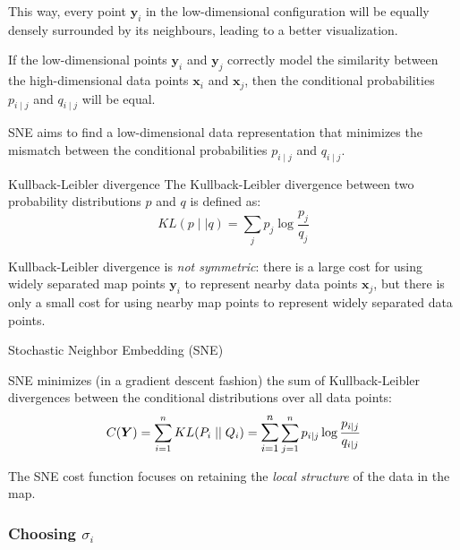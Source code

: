This way, every point $\boldsymbol y_i$ in the low-dimensional configuration will be
equally densely surrounded by its neighbours, leading to a better visualization.

If the low-dimensional points $\boldsymbol y_i$ and $\boldsymbol y_j$ correctly model
the similarity between the high-dimensional data points $\boldsymbol x_i$ and $\boldsymbol x_j$,
then the conditional probabilities $p_{i \mid j}$ and $q_{i \mid j}$ will be equal.

\begin{marker}
	SNE aims to find a low-dimensional data representation that minimizes
	the mismatch between the conditional probabilities $p_{i \mid j}$ and $q_{i \mid j}$.
\end{marker}

\begin{definition}{Kullback-Leibler divergence}{}
	The Kullback-Leibler divergence between two probability distributions $p$ and $q$ is defined as:
	\begin{equation*}
		KL(p \mid\mid q) = \sum_{j} p_j \log \frac{p_j}{q_j}
	\end{equation*}
	\tcblower
	\begin{note}
        Kullback-Leibler divergence is \emph{not symmetric}: there is a large
		cost for using widely separated map points $\boldsymbol y_i$ to
		represent nearby data points $\boldsymbol x_j$, but there is only a small
		cost for using nearby map points to represent widely separated data points.
	\end{note}
\end{definition}

\begin{problem}{Stochastic Neighbor Embedding (SNE)}{}

SNE minimizes (in a gradient descent fashion) the sum of Kullback-Leibler
divergences between the conditional distributions over all data points:
\begin{equation*}
	C(\boldsymbol Y) = \sum_{i=1}^n KL(P_i \mid\mid Q_i) =
	\mathlarger{\sum_{i=1}^n} \sum_{j=1}^n p_{i \mid j} \log \frac{p_{i \mid j}}{q_{i \mid j}}
\end{equation*}
\tcblower
\begin{note}
    The SNE cost function focuses on retaining the \emph{local structure} of the data in
	the map.
\end{note}
\end{problem}

\subsubsection{Choosing $\sigma_i$}

